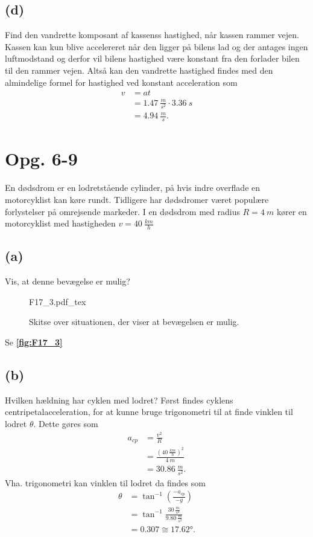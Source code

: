 \documentclass[12pt]{article}
\newcommand{\incfig}[2][1]{%
  \def\svgwidth{#1\columnwidth}
  {#2.pdf_tex}
}
\theoremstyle{definition}
\begin{document}
\subsection*{(d)}
Find den vandrette komposant af kassenss hastighed, når kassen rammer vejen.
\bigbreak
Kassen kan kun blive accelereret når den ligger på bilens lad og der antages ingen luftmodstand og derfor vil bilens hastighed være konstant fra den forlader bilen til den rammer vejen. Altså kan den vandrette hastighed findes med den almindelige formel for hastighed ved konstant acceleration som
\begin{align*}
  v &= at \\
  &= \qty{1,47}{\frac{m}{s^2}} \cdot \qty{3,36}{s}  \\
  &= \qty{4,94}{\frac{m}{s}} 
.\end{align*}


\section*{Opg. 6-9}
En dødsdrom er en lodretstående cylinder, på hvis indre overflade en motorcyklist kan køre rundt. Tidligere har dødsdromer været populære forlystelser på omrejsende markeder. I en dødsdrom med radius $ R = \qty{4}{m}$ kører en motorcyklist med hastigheden $v = \qty{40}{\frac{km}{h}}$

\subsection*{(a)}
Vis, at denne bevægelse er mulig?
\bigbreak
\begin{figure}[ht]
  \centering
  \incfig[0.8]{F17_3}
  \caption{Skitse over situationen, der viser at bevægelsen er mulig.}
  \label{fig:F17_3}
\end{figure}
Se \textbf{\autoref{fig:F17_3}}

\subsection*{(b)}
Hvilken hældning har cyklen med lodret?
\bigbreak
Først findes cyklens centripetalacceleration, for at kunne bruge trigonometri til at finde vinklen til lodret $\theta$. Dette gøres som
\begin{align*}
  a_{cp} &= \frac{v^2}{R} \\
  &= \frac{\left( \qty{40}{\frac{km}{h}}  \right)^2}{\qty{4}{m}} \\
  &= \qty{30,86}{\frac{m}{s^2}} 
.\end{align*}
Vha. trigonometri kan vinklen til lodret da findes som
\begin{align*}
  \theta &= \tan^{-1} \left( \frac{-a_{cp}}{-g} \right) \\
  &= \tan^{-1} \frac{\qty{30}{\frac{m}{s^2}}}{\qty{9,80}{\frac{m}{s^2}}} \\
  &= \num{0,307} \cong \ang{17,62} 
.\end{align*}
\end{document}
